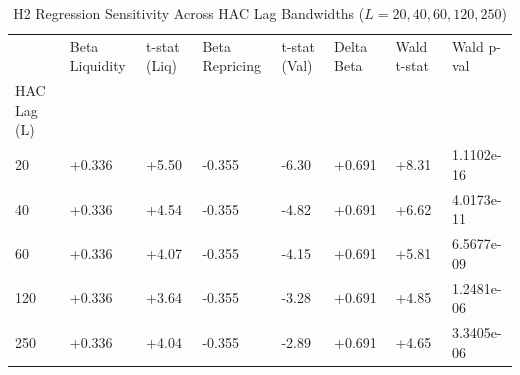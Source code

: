 \begin{table}
\caption{H2 Regression Sensitivity Across HAC Lag Bandwidths ($L = 20, 40, 60, 120, 250$)}
\label{tab:h2_hac}
\begin{tabular}{llllllll}
\toprule
 & Beta Liquidity & t-stat (Liq) & Beta Repricing & t-stat (Val) & Delta Beta & Wald t-stat & Wald p-val \\
HAC Lag (L) &  &  &  &  &  &  &  \\
\midrule
20 & +0.336 & +5.50 & -0.355 & -6.30 & +0.691 & +8.31 & 1.1102e-16 \\
40 & +0.336 & +4.54 & -0.355 & -4.82 & +0.691 & +6.62 & 4.0173e-11 \\
60 & +0.336 & +4.07 & -0.355 & -4.15 & +0.691 & +5.81 & 6.5677e-09 \\
120 & +0.336 & +3.64 & -0.355 & -3.28 & +0.691 & +4.85 & 1.2481e-06 \\
250 & +0.336 & +4.04 & -0.355 & -2.89 & +0.691 & +4.65 & 3.3405e-06 \\
\bottomrule
\end{tabular}
\end{table}
